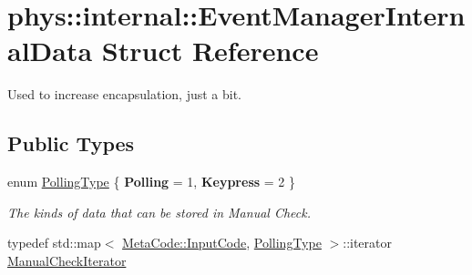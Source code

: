 \hypertarget{structphys_1_1internal_1_1EventManagerInternalData}{
\section{phys::internal::EventManagerInternalData Struct Reference}
\label{d6/d3a/structphys_1_1internal_1_1EventManagerInternalData}
}


Used to increase encapsulation, just a bit.  


\subsection*{Public Types}
\begin{DoxyCompactItemize}
\item 
enum \hyperlink{structphys_1_1internal_1_1EventManagerInternalData_ab9ab8380b84448aacf46a63050e159af}{PollingType} \{ {\bfseries Polling} = 1, 
{\bfseries Keypress} = 2
 \}
\begin{DoxyCompactList}\small\item\em The kinds of data that can be stored in Manual Check. \item\end{DoxyCompactList}\item 
typedef std::map$<$ \hyperlink{classphys_1_1MetaCode_a3e501cbb5bf0f6f1fdb7211465bda8d8}{MetaCode::InputCode}, \hyperlink{structphys_1_1internal_1_1EventManagerInternalData_ab9ab8380b84448aacf46a63050e159af}{PollingType} $>$::iterator \hyperlink{structphys_1_1internal_1_1EventManagerInternalData_ad2b9c7924f32e299846f1d945cb82dc0}{ManualCheckIterator}
\end{DoxyCompactItemize}
